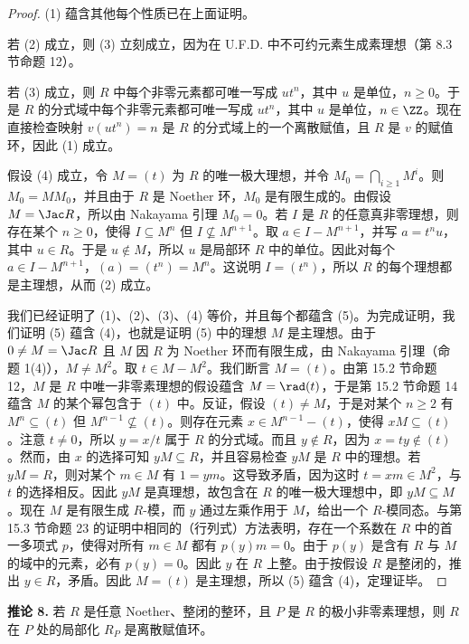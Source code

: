 \begin{proof}
(1) 蕴含其他每个性质已在上面证明。

若 (2) 成立，则 (3) 立刻成立，因为在 U.F.D. 中不可约元素生成素理想（第 8.3 节命题 12）。

若 (3) 成立，则 $R$ 中每个非零元素都可唯一写成 $ut^n$，其中 $u$ 是单位，$n\geq0$。于是 $R$ 的分式域中每个非零元素都可唯一写成 $ut^n$，其中 $u$ 是单位，$n\in\ZZ$。现在直接检查映射 $v(ut^n)=n$ 是 $R$ 的分式域上的一个离散赋值，且 $R$ 是 $v$ 的赋值环，因此 (1) 成立。

假设 (4) 成立，令 $M=(t)$ 为 $R$ 的唯一极大理想，并令 $M_0=\bigcap_{i\geq1}M^i$。则 $M_0=MM_0$，并且由于 $R$ 是 Noether 环，$M_0$ 是有限生成的。由假设 $M=\Jac R$，所以由 Nakayama 引理 $M_0=0$。若 $I$ 是 $R$ 的任意真非零理想，则存在某个 $n\geq0$，使得 $I\subseteq M^n$ 但 $I\nsubseteq M^{n+1}$。取 $a\in I-M^{n+1}$，并写 $a=t^nu$，其中 $u\in R$。于是 $u\notin M$，所以 $u$ 是局部环 $R$ 中的单位。因此对每个 $a\in I-M^{n+1}$，$(a)=(t^n)=M^n$。这说明 $I=(t^n)$，所以 $R$ 的每个理想都是主理想，从而 (2) 成立。

我们已经证明了 (1)、(2)、(3)、(4) 等价，并且每个都蕴含 (5)。为完成证明，我们证明 (5) 蕴含 (4)，也就是证明 (5) 中的理想 $M$ 是主理想。由于 $0\neq M=\Jac R$ 且 $M$ 因 $R$ 为 Noether 环而有限生成，由 Nakayama 引理（命题 1(4)），$M\neq M^2$。取 $t\in M-M^2$。我们断言 $M=(t)$。由第 15.2 节命题 12，$M$ 是 $R$ 中唯一非零素理想的假设蕴含 $M=\rad(t)$，于是第 15.2 节命题 14 蕴含 $M$ 的某个幂包含于 $(t)$ 中。反证，假设 $(t)\neq M$，于是对某个 $n\geq2$ 有 $M^n\subseteq(t)$ 但 $M^{n-1}\nsubseteq(t)$。则存在元素 $x\in M^{n-1}-(t)$，使得 $xM\subseteq(t)$。注意 $t\neq0$，所以 $y=x/t$ 属于 $R$ 的分式域。而且 $y\notin R$，因为 $x=ty\notin(t)$。然而，由 $x$ 的选择可知 $yM\subseteq R$，并且容易检查 $yM$ 是 $R$ 中的理想。若 $yM=R$，则对某个 $m\in M$ 有 $1=ym$。这导致矛盾，因为这时 $t=xm\in M^2$，与 $t$ 的选择相反。因此 $yM$ 是真理想，故包含在 $R$ 的唯一极大理想中，即 $yM\subseteq M$。现在 $M$ 是有限生成 $R$-模，而 $y$ 通过左乘作用于 $M$，给出一个 $R$-模同态。与第 15.3 节命题 23 的证明中相同的（行列式）方法表明，存在一个系数在 $R$ 中的首一多项式 $p$，使得对所有 $m\in M$ 都有 $p(y)m=0$。由于 $p(y)$ 是含有 $R$ 与 $M$ 的域中的元素，必有 $p(y)=0$。因此 $y$ 在 $R$ 上整。由于按假设 $R$ 是整闭的，推出 $y\in R$，矛盾。因此 $M=(t)$ 是主理想，所以 (5) 蕴含 (4)，定理证毕。
\end{proof}

\medskip
\noindent\textbf{推论 8.} 若 $R$ 是任意 Noether、整闭的整环，且 $P$ 是 $R$ 的极小非零素理想，则 $R$ 在 $P$ 处的局部化 $R_P$ 是离散赋值环。

